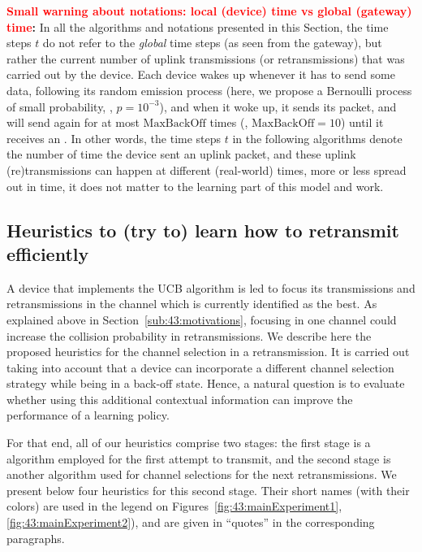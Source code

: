\begin{leftbar}[warningbar]  %
	\textbf{\textcolor{red}{Small warning about notations: local (device) time vs global (gateway) time}:}
	In all the algorithms and notations presented in this Section, the time steps $t$ do not refer to the \emph{global} time steps (as seen from the gateway), but rather the current number of uplink transmissions (or retransmissions) that was carried out by the device.
	Each device wakes up whenever it has to send some data, following its random emission process (here, we propose a Bernoulli process of small probability, \eg, $p=10^{-3}$), and when it woke up, it sends its packet, and will send again for at most $\mathrm{MaxBackOff}$ times (\eg, $\mathrm{MaxBackOff}=10$) until it receives an \Ack.
	In other words, the time steps $t$ in the following algorithms denote the number of time the device sent an uplink packet, and these uplink (re)transmissions can happen at different (real-world) times, more or less spread out in time, it does not matter to the learning part of this model and work.
\end{leftbar}  %


\subsection{Heuristics to (try to) learn how to retransmit efficiently}
\label{sub:43:heuristics}

A device that implements the UCB algorithm is led to focus its transmissions and retransmissions in the channel which is currently identified as the best.
As explained above in Section~\ref{sub:43:motivations}, focusing in one channel could increase the collision probability in retransmissions.
We describe here the proposed heuristics for the channel selection in a retransmission. It is carried out taking into account that a device can incorporate a different channel selection strategy while being in a back-off state.
Hence, a natural question is to evaluate whether using this additional contextual information can improve the performance of a learning policy.

For that end, all of our heuristics comprise two stages:
the first stage is a \UCB{} algorithm employed for the first attempt to transmit,
and the second stage is another algorithm used for channel selections for the next retransmissions.
%
We present below four heuristics for this second stage.
Their short names (with their colors) are used in the legend on Figures~\ref{fig:43:mainExperiment1}, \ref{fig:43:mainExperiment2}), and are given in ``quotes'' in the corresponding paragraphs.


